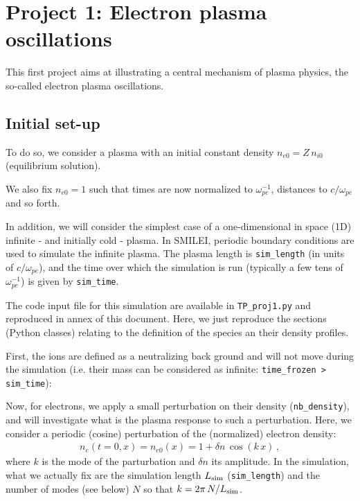 \documentclass[11pt,a4paper]{article}
\begin{document}
\newpage
\section*{Project 1: Electron plasma oscillations}\label{proj1}

This first project aims at illustrating a central mechanism of plasma physics, the so-called electron plasma oscillations.

\subsection*{Initial set-up}
To do so, we consider a plasma with an initial  constant density $n_{e0} = Z\,n_{i0}$ (equilibrium solution).

We also fix $n_{e0}=1$ such that times are now normalized to $\omega_{pe}^{-1}$, distances to $c/\omega_{pe}$ and so forth.

In addition, we will consider the simplest case of a one-dimensional in space (1D) infinite - and initially cold - plasma.
In SMILEI, periodic boundary conditions are used to simulate the infinite plasma.
The plasma length is \texttt{sim\_length}  (in units of $c/\omega_{pe}$), and the time over which the simulation is run (typically a few tens of $\omega_{pe}^{-1}$) is given by \texttt{sim\_time}. 

The code input file for this simulation are available in \texttt{TP\_proj1.py} and reproduced in annex of this document.
Here, we just reproduce the sections (Python classes) relating to the definition of the species an their density profiles. 

First, the ions are defined as a neutralizing back ground and will not move during the simulation (i.e. their mass can be considered as infinite: \texttt{time\_frozen > sim\_time}):


Now, for electrons, we apply a small perturbation on their density (\texttt{nb\_density}), and will investigate what is the plasma response to such a perturbation.
Here, we consider a periodic (cosine) perturbation of the (normalized) electron density:
\begin{eqnarray}\label{eq_pert}
n_e(t=0,x) = n_{e0}(x) = 1 + \delta n\,\cos(k\,x)\,,
\end{eqnarray}
where $k$ is the mode of the parturbation and $\delta n$ its amplitude. 
In the simulation, what we actually fix are the simulation length $L_{\rm sim}$ (\texttt{sim\_length}) and the number of modes (see below) $N$ so that $k=2\pi\,N/L_{\rm sim}$.
\end{document}
